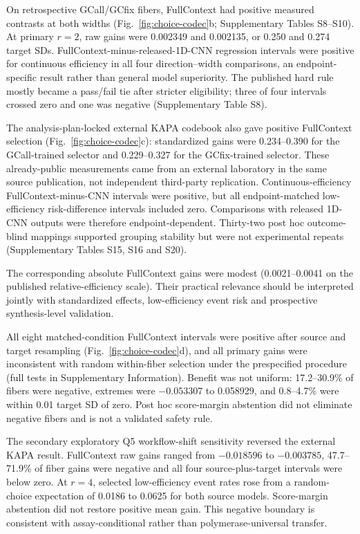 \documentclass[10pt]{article}
\begin{document}
On retrospective GCall/GCfix fibers, FullContext had positive measured contrasts at both widths (Fig.~\ref{fig:choice-codec}b; Supplementary Tables S8--S10). At primary $r=2$, raw gains were 0.002349 and 0.002135, or 0.250 and 0.274 target SDs. FullContext-minus-released-1D-CNN regression intervals were positive for continuous efficiency in all four direction--width comparisons, an endpoint-specific result rather than general model superiority. The published hard rule mostly became a pass/fail tie after stricter eligibility; three of four intervals crossed zero and one was negative (Supplementary Table S8).

The analysis-plan-locked external KAPA codebook also gave positive FullContext selection (Fig.~\ref{fig:choice-codec}c): standardized gains were 0.234--0.390 for the GCall-trained selector and 0.229--0.327 for the GCfix-trained selector. These already-public measurements came from an external laboratory in the same source publication, not independent third-party replication. Continuous-efficiency FullContext-minus-CNN intervals were positive, but all endpoint-matched low-efficiency risk-difference intervals included zero. Comparisons with released 1D-CNN outputs were therefore endpoint-dependent. Thirty-two post hoc outcome-blind mappings supported grouping stability but were not experimental repeats (Supplementary Tables S15, S16 and S20).

The corresponding absolute FullContext gains were modest (0.0021--0.0041 on the published relative-efficiency scale). Their practical relevance should be interpreted jointly with standardized effects, low-efficiency event risk and prospective synthesis-level validation.

All eight matched-condition FullContext intervals were positive after source and target resampling (Fig.~\ref{fig:choice-codec}d), and all primary gains were inconsistent with random within-fiber selection under the prespecified procedure (full tests in Supplementary Information). Benefit was not uniform: 17.2--30.9\% of fibers were negative, extremes were $-0.053307$ to 0.058929, and 0.8--4.7\% were within 0.01 target SD of zero. Post hoc score-margin abstention did not eliminate negative fibers and is not a validated safety rule.

The secondary exploratory Q5 workflow-shift sensitivity reversed the external KAPA result. FullContext raw gains ranged from $-0.018596$ to $-0.003785$, 47.7--71.9\% of fiber gains were negative and all four source-plus-target intervals were below zero. At $r=4$, selected low-efficiency event rates rose from a random-choice expectation of 0.0186 to 0.0625 for both source models. Score-margin abstention did not restore positive mean gain. This negative boundary is consistent with assay-conditional rather than polymerase-universal transfer.
\end{document}
